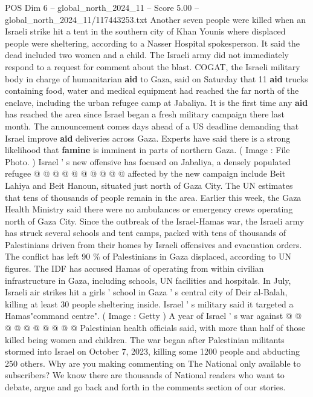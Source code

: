 \begin{textsample}{POS Dim 6 – global\_north\_2024\_11 – Score 5.00 – global\_north\_2024\_11/117443253.txt}  \label{ex:f6_pos_285}
Another seven people were killed when an Israeli strike hit a tent in the southern city of Khan Younis where displaced people were sheltering, according to a Nasser Hospital spokesperson.
It said the dead included two women and a child.
The Israeli army did not immediately respond to a request for comment about the blast.
COGAT, the Israeli military body in charge of humanitarian \textbf{aid} to Gaza, said on Saturday that 11 \textbf{aid} trucks containing food, water and medical equipment had reached the far north of the enclave, including the urban refugee camp at Jabaliya.
It is the first time any \textbf{aid} has reached the area since Israel began a fresh military campaign there last month.
The announcement comes days ahead of a US deadline demanding that Israel improve \textbf{aid} deliveries across Gaza.
Experts have said there is a strong likelihood that \textbf{famine} is imminent in parts of northern Gaza. ( Image : File Photo. ) Israel ' s new offensive has focused on Jabaliya, a densely populated refugee @ @ @ @ @ @ @ @ @ @ affected by the new campaign include Beit Lahiya and Beit Hanoun, situated just north of Gaza City.
The UN estimates that tens of thousands of people remain in the area.
Earlier this week, the Gaza Health Ministry said there were no ambulances or emergency crews operating north of Gaza City.
Since the outbreak of the Israel-Hamas war, the Israeli army has struck several schools and tent camps, packed with tens of thousands of Palestinians driven from their homes by Israeli offensives and evacuation orders.
The conflict has left 90 \% of Palestinians in Gaza displaced, according to UN figures.
The IDF has accused Hamas of operating from within civilian infrastructure in Gaza, including schools, UN facilities and hospitals.
In July, Israeli air strikes hit a girls ' school in Gaza ' s central city of Deir al-Balah, killing at least 30 people sheltering inside.
Israel ' s military said it targeted a Hamas"command centre". ( Image : Getty ) A year of Israel ' s war against @ @ @ @ @ @ @ @ @ @ Palestinian health officials said, with more than half of those killed being women and children.
The war began after Palestinian militants stormed into Israel on October 7, 2023, killing some 1200 people and abducting 250 others.
Why are you making commenting on The National only available to subscribers?
We know there are thousands of National readers who want to debate, argue and go back and forth in the comments section of our stories.

\end{textsample}

